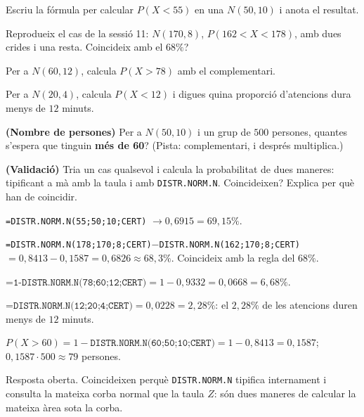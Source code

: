 \begin{exercicis}
\begin{exlist}
  \item Escriu la fórmula per calcular $P(X<55)$ en una $N(50,10)$ i anota el resultat.
  \item Reprodueix el cas de la sessió 11: $N(170,8)$, $P(162<X<178)$, amb dues crides i
        una resta. Coincideix amb el $68\%$?
  \item Per a $N(60,12)$, calcula $P(X>78)$ amb el complementari.
  \item Per a $N(20,4)$, calcula $P(X<12)$ i digues quina proporció d'atencions dura menys
        de $12$ minuts.
  \item \textbf{(Nombre de persones)} Per a $N(50,10)$ i un grup de $500$ persones,
        quantes s'espera que tinguin \textbf{més de 60}? (Pista: complementari, i després
        multiplica.)
  \item \textbf{(Validació)} Tria un cas qualsevol i calcula la probabilitat de dues
        maneres: tipificant a mà amb la taula i amb \texttt{DISTR.NORM.N}. Coincideixen?
        Explica per què han de coincidir.
\end{exlist}
\end{exercicis}

\begin{solucions}
\begin{sollist}
  \item \texttt{=DISTR.NORM.N(55;50;10;CERT)} $\to 0,6915=69,15\%$.
  \item \texttt{=DISTR.NORM.N(178;170;8;CERT)}$-$\texttt{DISTR.NORM.N(162;170;8;CERT)}
        $=0,8413-0,1587=0,6826\approx 68,3\%$. Coincideix amb la regla del $68\%$.
  \item $\texttt{=1-DISTR.NORM.N(78;60;12;CERT)}=1-0,9332=0,0668=6,68\%$.
  \item $\texttt{=DISTR.NORM.N(12;20;4;CERT)}=0,0228=2,28\%$: el $2,28\%$ de les atencions
        duren menys de $12$ minuts.
  \item $P(X>60)=1-\texttt{DISTR.NORM.N(60;50;10;CERT)}=1-0,8413=0,1587$;
        $0,1587\cdot 500\approx 79$ persones.
  \item Resposta oberta. Coincideixen perquè \texttt{DISTR.NORM.N} tipifica internament i
        consulta la mateixa corba normal que la taula $Z$: són dues maneres de calcular la
        mateixa àrea sota la corba.
\end{sollist}
\end{solucions}
